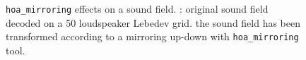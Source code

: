 \documentclass[10pt,a4paper]{article}
\begin{document}
\begin{figure}[!ht]
\centering
{}
\caption{\lstinline'hoa_mirroring' effects on a sound field. : original sound field decoded on a 50 loudspeaker Lebedev grid.  the sound field has been transformed according to a mirroring up-down with \lstinline'hoa_mirroring' tool.}
\label{fig:hoa_mirroring_2}
\end{figure}


\pagebreak
\end{document}
